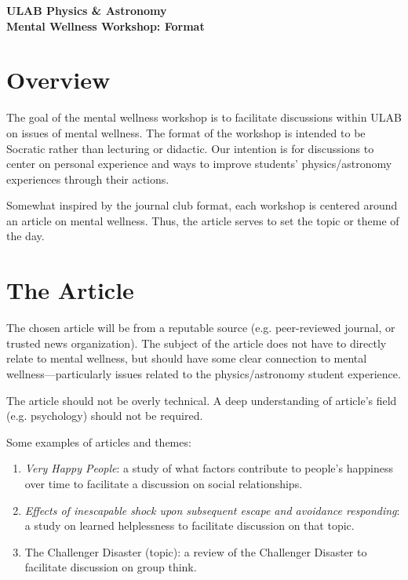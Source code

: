\documentclass[addpoints,12pt]{exam}
\numberwithin{equation}{section}
\begin{document}
	
	\begin{center}
		\textbf{\Large{ULAB Physics \& Astronomy\\Mental Wellness Workshop: Format}}
	\end{center}

	\section{Overview}
	
	The goal of the mental wellness workshop is to facilitate discussions within ULAB on issues of mental wellness. The format of the workshop is intended to be Socratic rather than lecturing or didactic. Our intention is for discussions to center on personal experience and ways to improve students' physics/astronomy experiences through their actions. 
	
	Somewhat inspired by the journal club format, each workshop is centered around an article on mental wellness. Thus, the article serves to set the topic or theme of the day.
	
	\section{The Article}
	
	The chosen article will be from a reputable source (e.g. peer-reviewed journal, or trusted news organization). The subject of the article does not have to directly relate to mental wellness, but should have some clear connection to mental wellness---particularly issues related to the physics/astronomy student experience.
	
	The article should not be overly technical. A deep understanding of article's field (e.g. psychology) should not be required.
	
	Some examples of articles and themes:
	\begin{enumerate}
		\item \textit{Very Happy People}\cite{diener2002very}: a study of what factors contribute to people's happiness over time to facilitate a discussion on social relationships.
		\item \textit{Effects of inescapable shock upon subsequent escape and avoidance responding}\cite{overmier1967effects}: a study on learned helplessness to facilitate discussion on that topic.
		\item The Challenger Disaster (topic): a review of the Challenger Disaster to facilitate discussion on group think. 
	\end{enumerate}
	
\end{document}
